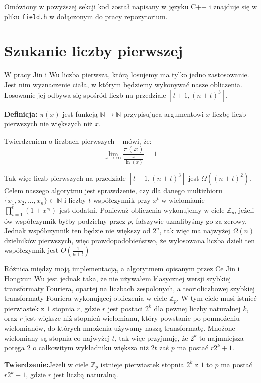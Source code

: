 \documentclass{article}
\begin{document}
Omówiony w powyższej sekcji kod został napisany w języku C++ i znajduje się w 
pliku \texttt{field.h} w dołączonym do pracy repozytorium.


\section{Szukanie liczby pierwszej}
W pracy Jin i Wu liczba pierwsza, którą losujemy ma tylko jedno zastosowanie. Jest nim
wyznaczenie ciała, w którym będziemy wykonywać nasze obliczenia. Losowanie jej odbywa się 
spośród liczb na przedziale $[t+1,(n+t)^3]$. 

\begin{tcolorbox}
        \textbf{Definicja:} $\pi(x)$ jest funkcją $\mathbb{N}\to\mathbb{N}$ przypisująca argumentowi $x$ liczbę 
        liczb pierwszych nie większych niż $x$.
\end{tcolorbox}

Twierdzeniem o liczbach pierwszych ~\cite{goldfeld2004elementary} mówi, że: 
$$\lim_{x \to \infty} \frac{\pi(x)}{\frac{x}{\ln(x)}}=1$$

Tak więc liczb pierwszych na przedziale $[t+1,(n+t)^3]$ jest $\Omega((n+t)^2)$. Celem naszego algorytmu jest sprawdzenie,
czy dla danego multizbioru $\{x_1,x_2,...,x_n\} \subset \mathbb{N}$ i liczby $t$ współczynnik przy $x^t$ w wielomianie 
$\prod_{i=1}^{t}(1+x^{s_i})$ jest dodatni. Ponieważ obliczenia wykonujemy w ciele $\mathbb{Z}_p$, jeżeli 
ów współczynnik byłby podzielny przez $p$, fałszywie uznalibyśmy go za zerowy. Jednak współczynnik ten będzie 
nie większy od $2^n$, tak więc ma najwyżej $\Omega(n)$ dzielników pierwszych, więc prawdopodobieństwo, że wylosowana
liczba dzieli ten współczynnik jest $O(\frac{1}{n+t})$

Różnica między moją implementacją, a algorytmem opisanym przez Ce Jin i Hongxun Wu jest 
jednak taka, że nie używałem klasycznej wersji szybkiej transformaty Fouriera, opartej na
liczbach zespolonych, a teorioliczbowej szybkiej transformaty Fouriera wykonującej obliczenia
w ciele $\mathbb{Z}_p$. W tym ciele musi istnieć pierwiastek z $1$ stopnia $r$, gdzie
$r$ jest postaci $2^k$ dla pewnej liczby naturalnej $k$, oraz $r$ jest większe niż 
stopnień wielomianu, który powstanie po pomnożeniu wielomianów, do których mnożenia używamy naszą 
transformatę. Mnożone wielomiany są stopnia co najwyżej $t$, tak więc
przyjmuję, że $2^k$ to najmniejsza potęga $2$ o całkowitym wykładniku większa niż 
$2t$ zaś $p$ ma postać $r2^k+1$. 
\begin{tcolorbox}
    \textbf{Twierdzenie:}Jeżeli w ciele $\mathbb{Z}_p$ istnieje pierwiastek stopnia $2^k$ z $1$ to $p$ ma postać $r2^k+1$, gdzie $r$ jest liczbą naturalną.
\end{tcolorbox}
\end{document}

